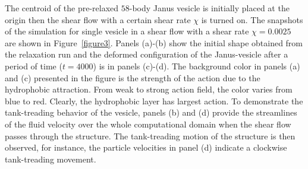 \documentclass[lineno]{jfm}
\begin{document}
The centroid of the pre-relaxed $58$-body Janus vesicle is initially placed at the origin then the shear flow 
with a certain shear rate $\chi$ is turned on. 
The snapshots of the simulation for single vesicle in a shear flow with a shear rate $\chi=0.0025$ are shown 
in Figure~\ref{figure3}.
Panels (a)-(b) show the initial shape obtained from the relaxation run and the deformed 
configuration of the Janus-vesicle after a period of time ($t=4000$) is in panels (c)-(d). 
The background color in panels (a) and (c) presented in the figure is the strength of the action due to the
hydrophobic attraction. From weak to strong action field, the color varies from blue to red. Clearly, the
hydrophobic layer has largest action. To demonstrate the tank-treading behavior of the vesicle, panels (b) 
and (d) provide the streamlines of the fluid velocity over the whole computational domain when the shear 
flow passes through the structure. The tank-treading motion of the structure is then observed, for instance,
the particle velocities in panel (d) indicate a clockwise tank-treading movement.
\end{document}
